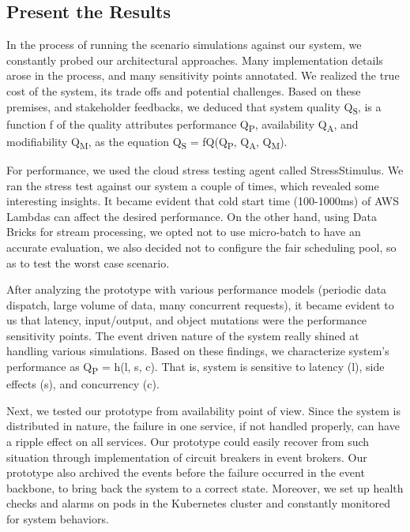 \documentclass[conference]{IEEEtran}
\begin{document}
\subsection{Present the Results}

In the process of running the scenario simulations against our system, we constantly probed our architectural approaches. 
Many implementation details arose in the process, and many sensitivity points annotated. We realized the true cost of the system, its trade offs and potential challenges. Based on these premises, and stakeholder feedbacks, we deduced that system quality Q\textsubscript{S}, is a function f of the quality attributes performance Q\textsubscript{P}, availability Q\textsubscript{A}, and modifiability Q\textsubscript{M}, as the equation Q\textsubscript{S} = fQ(Q\textsubscript{P}, Q\textsubscript{A}, Q\textsubscript{M}).

For performance, we used the cloud stress testing agent called StressStimulus. We ran the stress test against our system a couple of times, which revealed some interesting insights. It became evident that cold start time (100-1000ms) of AWS Lambdas can affect the desired performance. On the other hand, using Data Bricks for stream processing, we opted not to use micro-batch to have an accurate evaluation, we also decided not to configure the fair scheduling pool, so as to test the worst case scenario. 


After analyzing the prototype with various performance models (periodic data dispatch, large volume of data, many concurrent requests), it became evident to us that latency, input/output, and object mutations were the performance sensitivity points. The event driven nature of the system really shined at handling various simulations. Based on these findings, we characterize system's performance as  Q\textsubscript{P} = h(l, s, c). That is, system is sensitive to latency (l), side effects (s), and concurrency (c).

Next, we tested our prototype from availability point of view. Since the system is distributed in nature, the failure in one service, if not handled properly, can have a ripple effect on all services. Our prototype could easily recover from such situation through implementation of circuit breakers in event brokers. Our prototype also archived the events before the failure occurred in the event backbone, to bring back the system to a correct state. Moreover, we set up health checks and alarms on pods in the Kubernetes cluster and constantly monitored for system behaviors. 
\end{document}

